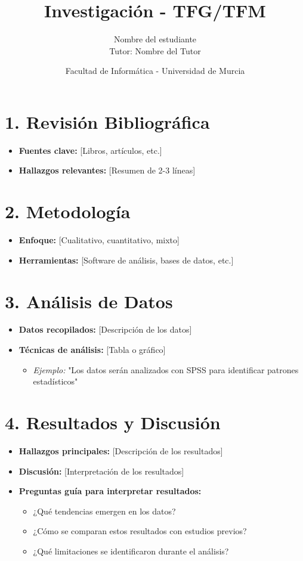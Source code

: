 \documentclass[12pt, a4paper]{article}
\title{\textbf{Investigación - TFG/TFM}}
\author{Nombre del estudiante \\ Tutor: Nombre del Tutor}
\date{Facultad de Informática - Universidad de Murcia}
\begin{document}
\maketitle

\section*{1. Revisión Bibliográfica}
\begin{itemize}
    \item \textbf{Fuentes clave:} [Libros, artículos, etc.]
    \item \textbf{Hallazgos relevantes:} [Resumen de 2-3 líneas]
\end{itemize}

\section*{2. Metodología}
\begin{itemize}
    \item \textbf{Enfoque:} [Cualitativo, cuantitativo, mixto]
    \item \textbf{Herramientas:} [Software de análisis, bases de datos, etc.]
\end{itemize}

\section*{3. Análisis de Datos}
\begin{itemize}
    \item \textbf{Datos recopilados:} [Descripción de los datos]
    \item \textbf{Técnicas de análisis:} [Tabla o gráfico]
    \begin{itemize}
        \item \textit{Ejemplo:} "Los datos serán analizados con SPSS para identificar patrones estadísticos"
    \end{itemize}
\end{itemize}

\section*{4. Resultados y Discusión}
\begin{itemize}
    \item \textbf{Hallazgos principales:} [Descripción de los resultados]
    \item \textbf{Discusión:} [Interpretación de los resultados]
    \item \textbf{Preguntas guía para interpretar resultados:}
    \begin{itemize}
        \item ¿Qué tendencias emergen en los datos?
        \item ¿Cómo se comparan estos resultados con estudios previos?
        \item ¿Qué limitaciones se identificaron durante el análisis?
    \end{itemize}
\end{itemize}
\end{document}
